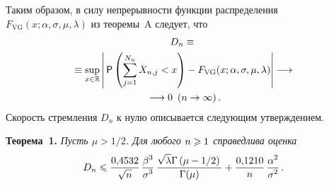 \begin{multicols}{2}
Таким образом, в силу непрерывности функции распределения
$F_{\mathrm{VG}}(x;\alpha,\sigma,\mu,\lambda)$ из теоремы~A следует, что
\begin{multline*}
D_n\equiv{}\\
{}\equiv \sup\limits_{x\in\mathbb{R}}\left\vert \,{\sf P}
\left(\sum\limits_{j=1}^{N_n}X_{n,j}<x\right)-F_{\mathrm{VG}}(x;\alpha,\sigma,\mu,\lambda)
\right\vert\longrightarrow{}\\
{}\longrightarrow 
0\enskip (n\to\infty)\,.
\end{multline*}
Скорость стремления $D_n$ к нулю описывается следующим утверждением.

\smallskip

\noindent
\textbf{Теорема~1.} \textit{Пусть $\mu>1/2$. Для любого $n\hm\geqslant1$
справедлива оценка}
$$
D_n\leqslant\displaystyle\frac{\displaystyle 0{,}4532\mathstrut}{\displaystyle \sqrt{n}\mathstrut}\,\displaystyle\frac{\displaystyle \beta^3\mathstrut}{\displaystyle \sigma^3\mathstrut}\,
\displaystyle\frac{\displaystyle \sqrt{\lambda}\Gamma\left(\mu-{1}/{2}\right)\mathstrut}{\displaystyle \Gamma(\mu)\mathstrut}
+\displaystyle\frac{\displaystyle 0{,}1210\mathstrut}{\displaystyle n\mathstrut}\,\displaystyle\frac{\displaystyle \alpha^2\mathstrut}{\displaystyle \sigma^2\mathstrut}\,.
$$

\smallskip


\end{multicols}
